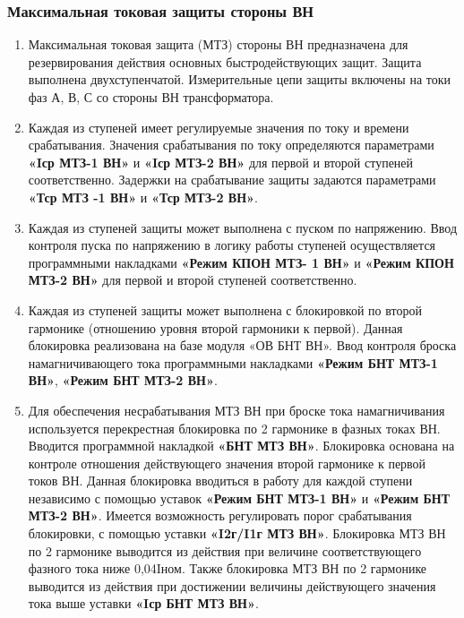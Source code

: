 \color{black}

\subsubsection{Максимальная токовая защиты стороны ВН}

\begin{enumerate}[label=\arabic{section}.\arabic{subsection}.\arabic{subsubsection}.\arabic*,  align=left, labelsep=4pt, leftmargin=0pt, itemindent=57pt]

\item
Максимальная токовая защита (МТЗ) стороны ВН предназначена для резервирования действия
основных быстродействующих защит. Защита выполнена двухступенчатой. Измерительные цепи
защиты включены на токи фаз А, В, С со стороны ВН трансформатора.    

\item
Каждая из ступеней имеет регулируемые значения по току и времени срабатывания. Значения
срабатывания по току определяются параметрами \textbf{«Iср МТЗ-1 ВН»} и \textbf{«Iср МТЗ-2 ВН»} для первой и
второй ступеней соответственно. Задержки на срабатывание защиты задаются параметрами \textbf{«Тср МТЗ
-1 ВН»} и \textbf{«Тср МТЗ-2 ВН»}.

\item
Каждая из ступеней защиты может выполнена с пуском по напряжению. Ввод контроля пуска по
напряжению в логику работы ступеней осуществляется программными накладками \textbf{«Режим КПОН МТЗ-
1 ВН»} и \textbf{«Режим КПОН МТЗ-2 ВН»} для первой и второй ступеней соответственно. 

\item
Каждая из ступеней защиты может выполнена с блокировкой по второй гармонике (отношению
уровня второй гармоники к первой). Данная блокировка реализована на базе модуля «ОВ БНТ ВН». Ввод
контроля броска намагничивающего тока программными накладками  \textbf{«Режим БНТ МТЗ-1 ВН»}, \textbf{«Режим
БНТ МТЗ-2 ВН»}.

\item
Для обеспечения несрабатывания МТЗ ВН при броске тока намагничивания используется
перекрестная блокировка по 2 гармонике в фазных токах ВН. Вводится программной накладкой \textbf{«БНТ
МТЗ ВН»}. Блокировка основана на контроле отношения действующего значения второй гармонике к
первой токов ВН. Данная блокировка вводиться в работу для каждой ступени независимо с помощью
уставок \textbf{«Режим БНТ МТЗ-1 ВН»} и \textbf{«Режим БНТ МТЗ-2 ВН»}. Имеется возможность регулировать порог
срабатывания блокировки, с помощью уставки \textbf{«I2г/I1г МТЗ ВН»}. Блокировка МТЗ ВН по 2 гармонике
выводится из действия при величине соответствующего фазного тока ниже 0,04Iном. Также блокировка
МТЗ ВН по 2 гармонике выводится из действия при достижении величины действующего значения тока
выше уставки \textbf{«Iср БНТ МТЗ ВН»}.


\end{enumerate}
